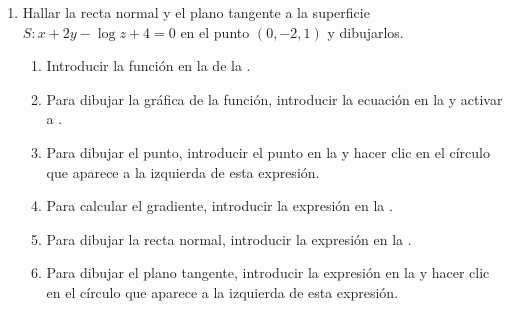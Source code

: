 \begin{enumerate}[leftmargin=*]

\item Hallar la recta normal y el plano tangente a la superficie $S: x+2y-\log z +4 =0$ en el punto $(0,-2,1)$ y dibujarlos.
      \begin{indication}
      \begin{enumerate}
      \item Introducir la función  en la  de la .
      \item Para dibujar la gráfica de la función, introducir la ecuación  en la  y activar a .
      \item Para dibujar el punto, introducir el punto  en la  y hacer clic en el círculo que aparece a la izquierda de esta expresión.
      \item Para calcular el gradiente, introducir la expresión  en la .
      \item Para dibujar la recta normal, introducir la expresión  en la .
      \item Para dibujar el plano tangente, introducir la expresión  en la  y hacer clic en el círculo que aparece a la izquierda de esta expresión.
      \end{enumerate}
      \end{indication}


\end{enumerate}
